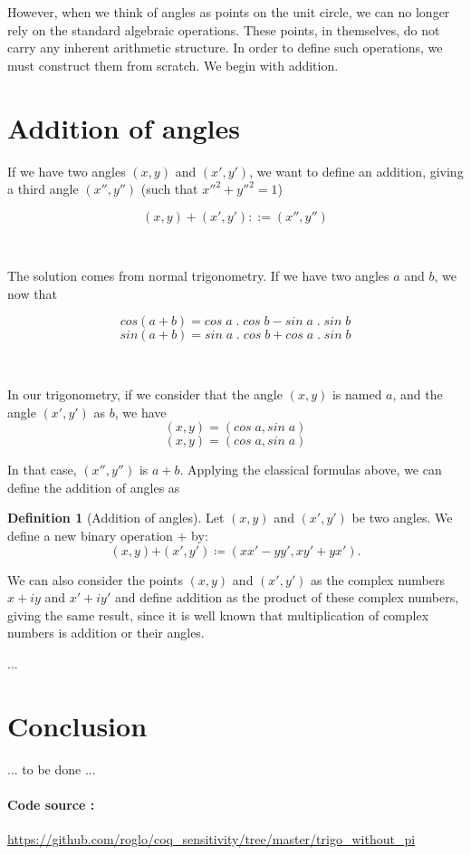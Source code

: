 \documentclass[11pt]{article}
\theoremstyle{definition}
\newtheorem{definition}{Definition}[section]
\begin{document}
However, when we think of angles as points on the unit circle, we can
no longer rely on the standard algebraic operations. These points, in
themselves, do not carry any inherent arithmetic structure. In order
to define such operations, we must construct them from scratch. We
begin with addition.

\section{Addition of angles}

If we have two angles $(x, y)$ and $(x', y')$, we want to define an
addition, giving a third angle $(x'', y'')$ (such that
$x''^2+y''^2=1$)

\[
(x, y) + (x', y') ::= (x'', y'')
\]

\

\noindent The solution comes from normal trigonometry. If we have two
angles $a$ and $b$, we now that

\[
cos(a+b) = cos\;a\;.\;cos\;b - sin\;a\;.\;sin\;b
\]
\[
sin(a+b) = sin\;a\;.\;cos\;b + cos\;a\;.\;sin\;b
\]

\

\noindent In our trigonometry, if we consider that the angle $(x, y)$
is named $a$, and the angle $(x', y')$ as $b$, we have
\[
(x, y) = (cos\;a, sin\;a)
\]
\[
(x, y) = (cos\;a, sin\;a)
\]

\noindent In that case, $(x'', y'')$ is $a + b$.  Applying the
classical formulas above, we can define the addition of angles as

\begin{definition}[Addition of angles]

Let $(x, y)$ and $(x', y')$ be two angles. We define a new binary
operation $\boldsymbol{+}$ by:
\[
(x, y) \boldsymbol{+} (x', y') \coloneqq (x x' - y y', x y' + y x').
\]

\end{definition}

\noindent We can also consider the points $(x, y)$ and $(x', y')$ as
the complex numbers $x+iy$ and $x'+iy'$ and define addition as the
product of these complex numbers, giving the same result, since it is
well known that multiplication of complex numbers is addition or their
angles.

...

\section{Conclusion}

... to be done ...

\paragraph{Code source :}
\url{https://github.com/roglo/coq_sensitivity/tree/master/trigo_without_pi}
\end{document}
